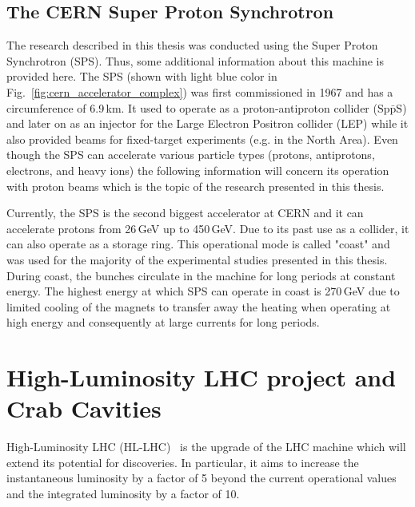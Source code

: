  \subsection{The CERN Super Proton Synchrotron}
 The research described in this thesis was conducted using the Super Proton Synchrotron (SPS). Thus, some additional information about this machine is provided here. The SPS (shown with light blue color in Fig.~\ref{fig:cern_accelerator_complex}) was first commissioned in 1967 and has a circumference of 6.9\,km. It used to operate as a proton-antiproton collider ($\mathrm{Sp\bar{p}S}$) and later on as an injector for the Large Electron Positron collider (LEP) while it also provided beams for fixed-target experiments (e.g. in the North Area). Even though the SPS can accelerate various particle types (protons, antiprotons, electrons, and heavy ions) the following information will concern its operation with proton beams which is the topic of the research presented in this thesis.

 Currently, the SPS is the second biggest accelerator at CERN and it can accelerate protons from 26\,GeV up to 450\,GeV. Due to its past use as a collider, it can also operate as a storage ring. This operational mode is called "coast" and was used for the majority of the experimental studies presented in this thesis. During coast, the bunches circulate in the machine for long periods at constant energy. The highest energy at which SPS can operate in coast is 270\,GeV due to limited cooling of the magnets to transfer away the heating when operating at high energy and consequently at large currents for long periods.

 

\section{High-Luminosity LHC project and Crab Cavities}
High-Luminosity LHC (HL-LHC)~\cite{HL_LHC_yellow_report, Brning2015} is the upgrade of the LHC machine which will extend its potential for discoveries. In particular, it aims to increase the instantaneous luminosity by a factor of 5 beyond the current operational values and the integrated luminosity by a factor of 10. 

